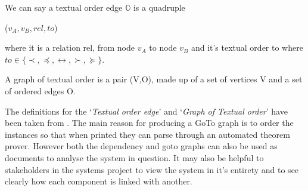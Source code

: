 \begin{defin} We can say a textual order edge $\mathbb{O}$
is a quadruple
\begin{center}
($v_{A}, v_{B}, rel, to$)
\end{center}
where it is a relation rel, from node $v_{A}$ to node $v_{B}$ and it's textual
order to where $to \in \{\prec , \preceq , \leftrightarrow , \succ , \succeq
\}$.
\end{defin}

\begin{defin} A graph of textual order is a pair (V,O),
made up of a set of vertices V and a set of ordered edges O.
\end{defin}

The definitions for the `\emph{Textual order edge}' and `\emph{Graph of Textual
order}' have been taken from \cite{zengfirstyear}. The main reason for producing
a GoTo graph is to order the instances so that when printed they can parse
through an automated theorem prover. However both the dependency and goto graphs
can also be used as documents to analyse the system in question. It may also be
helpful to stakeholders in the systems project to view the system in it's
entirety and to see clearly how each component is linked with another.

